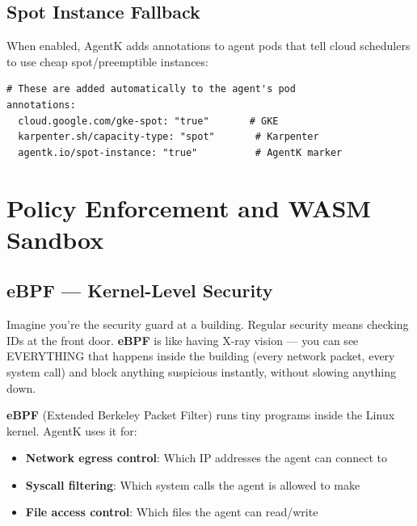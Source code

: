 \documentclass[12pt,a4paper,openany]{report}
\begin{document}
\section{Spot Instance Fallback}

When enabled, AgentK adds annotations to agent pods that tell cloud schedulers to use cheap spot/preemptible instances:

\begin{lstlisting}[style=yaml, caption={Auto-generated spot annotations}]
# These are added automatically to the agent's pod
annotations:
  cloud.google.com/gke-spot: "true"       # GKE
  karpenter.sh/capacity-type: "spot"       # Karpenter
  agentk.io/spot-instance: "true"          # AgentK marker
\end{lstlisting}


\chapter{Policy Enforcement and WASM Sandbox}

\section{eBPF — Kernel-Level Security}

\begin{analogybox}
Imagine you're the security guard at a building. Regular security means checking IDs at the front door. \textbf{eBPF} is like having X-ray vision — you can see EVERYTHING that happens inside the building (every network packet, every system call) and block anything suspicious instantly, without slowing anything down.
\end{analogybox}

\textbf{eBPF} (Extended Berkeley Packet Filter) runs tiny programs inside the Linux kernel. AgentK uses it for:
\begin{itemize}
    \item \textbf{Network egress control}: Which IP addresses the agent can connect to
    \item \textbf{Syscall filtering}: Which system calls the agent is allowed to make
    \item \textbf{File access control}: Which files the agent can read/write
\end{itemize}
\end{document}
